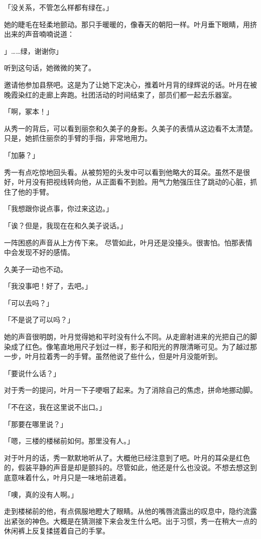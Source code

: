 \documentclass[UTF8]{ctexart}
\begin{document}
    「没关系，不管怎么样都有绿在。」

    她的睫毛在轻柔地颤动。那只手暖暖的，像春天的朝阳一样。叶月垂下眼睛，用挤出来的声音喃喃说道：

    」……绿，谢谢你」

    听到这句话，她微微的笑了。

    邀请他参加县祭吧。这是为了让她下定决心，推着叶月背的绿辉说的话。叶月在被晚霞染红的走廊上奔跑。社团活动的时间结束了，部员们都一起去乐器室。

    「啊，冢本！」

    从秀一的背后，可以看到丽奈和久美子的身影。久美子的表情从这边看不太清楚。只是，她抓住丽奈的手臂的手指，非常地用力。

    「加藤？」

    秀一有点吃惊地回头看。从被剪短的头发中可以看到他略大的耳朵。虽然不是很好，叶月没有把视线转向他，从正面看不到脸。用气力勉强压住了跳动的心脏，抓住了他的手臂。

    「我想跟你说点事，你过来这边。」

    「诶？但是，我现在在和久美子说话。」

    一阵困惑的声音从上方传下来。 尽管如此，叶月还是没擡头。很害怕。怕那表情中会发现不好的感情。

    久美子一动也不动。

    「我没事吧！好了，去吧。」

    「可以去吗？」

    「不是说了可以吗？」

    她的声音很明朗，叶月觉得她和平时没有什么不同。从走廊射进来的光把自己的脚染成了红色。像笔直地用尺子划过一样，影子和阳光的界限清晰可见。为了越过那一步，叶月拉着秀一的手臂。虽然他说了些什么，但是叶月没能听到。

    「要说什么话？」

    对于秀一的提问，叶月一下子哽咽了起来。为了消除自己的焦虑，拼命地挪动脚。

    「不在这，我在这里说不出口。」

    「那要在哪里说？」

    「嗯，三楼的楼梯前如何。那里没有人。」

    对于叶月的话，秀一默默地听从了。大概他已经注意到了吧。叶月的耳朵是红色的，假装平静的声音是却是颤抖的。尽管如此，他还是什么也没说。不想去想这到底意味着什么，叶月只是一味地前进着。

    「噢，真的没有人啊。」

    走到楼梯前的他，有点佩服地瞪大了眼睛。从他的嘴唇流露出的叹息中，隐约流露出紧张的神色。大概是在猜测接下来会发生什么吧。出于习惯，秀一在稍大一点的休闲裤上反复揉搓着自己的手掌。
\end{document}
